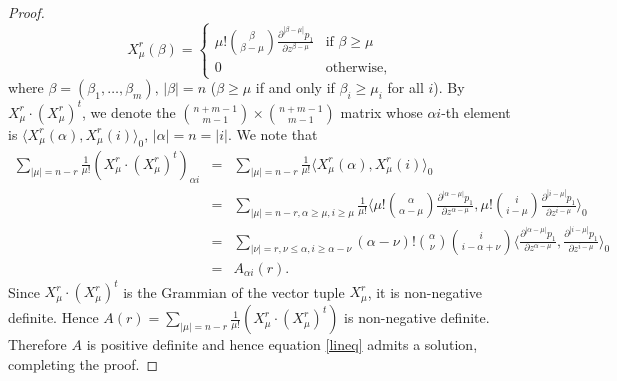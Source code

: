 \documentclass[11pt]{amsart}
\theoremstyle{definition}
\numberwithin{equation}{section}
\begin{document}
\begin{proof}
$$
X^{r}_\mu(\beta) = \begin{cases}\mu !\binom{\beta}{\beta-\mu}\frac{\partial^{|\beta-\mu|}p_1}{\partial z^{\beta-\mu}} &\mbox{if}\,\, \beta\geq \mu\\ 0 &\mbox{otherwise,}\end{cases}
$$
where $\beta= (\beta_1,\ldots,\beta_m),\,|\beta|=n$ ($\beta\geq \mu$ if and only if $\beta_i\geq\mu_i$ for all $i$). By $X^{r}_{\mu}\cdot (X^{r}_{\mu})^t$, we denote the $\binom{n+m-1}{m-1}\times \binom{n+m-1}{m-1}$ matrix whose ${\alpha} i$-th element is $\langle X^{r}_\mu({\alpha}), X^{r}_\mu(i)\rangle_0, \, |{\alpha}|=n=|i|$. We note that
\begin{eqnarray}\label{pd1}
\sum_{|\mu|=n-r}\frac{1}{\mu!}(X^{r}_\mu\cdot (X^{r}_\mu)^t)_{{\alpha} i} &=& \sum_{|\mu|=n-r}\frac{1}{\mu!}\langle X^{r}_\mu({\alpha}), X^{r}_\mu(i)\rangle_0 \\ &=& \sum_{|\mu|= n-r,{\alpha}\geq \mu, i\geq\mu }\frac{1}{\mu!}\langle \mu !\binom{\alpha}{{\alpha}-\mu} \frac{\partial^{|{\alpha}-\mu|}p_1}{\partial z^{{\alpha}-\mu}}, \mu !\binom{i}{i-\mu} \frac{\partial^{|i-\mu|}p_1}{\partial z^{i-\mu}} \rangle_0\nonumber\\ &=& \sum_{|\nu|= r,\nu\leq{\alpha}, i\geq {\alpha} -\nu }({\alpha} -\nu)!\binom{\alpha}{\nu}\binom{i}{i-{\alpha}+\nu}\langle  \frac{\partial^{|{\alpha}-\mu|}p_1}{\partial z^{{\alpha}-\mu}}, \frac{\partial^{|i-\mu|}p_1}{\partial z^{i-\mu}} \rangle_0 \nonumber \\
&=& A_{{\alpha} i}(r). \nonumber
\end{eqnarray}
Since $X^{r}_\mu\cdot (X^{r}_\mu)^t$ is the Grammian of the vector tuple $X^{r}_\mu$, it is non-negative definite. Hence $A(r) = \sum_{|\mu|=n-r}\frac{1}{\mu!}(X^{r}_\mu\cdot (X^{r}_\mu)^t)$ is non-negative definite. Therefore $A$ is positive definite and hence equation \eqref{lineq} admits a solution, completing the proof.
\end{proof}
\end{document}
